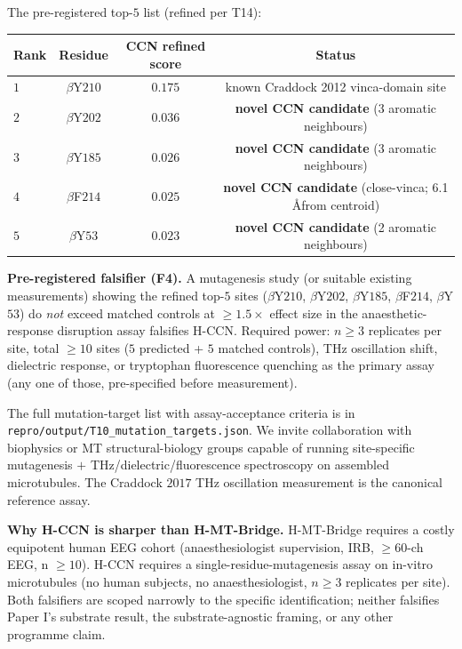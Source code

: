 \documentclass[11pt,a4paper]{article}
\begin{document}
The pre-registered top-$5$ list (refined per \textsf{T14}):

\begin{center}
\begin{tabular}{lccc}\toprule
Rank & Residue & CCN refined score & Status \\\midrule
$1$ & $\beta$Y$210$ & $0.175$ & known Craddock 2012 vinca-domain site \\
$2$ & $\beta$Y$202$ & $0.036$ & \textbf{novel CCN candidate} (3 aromatic neighbours) \\
$3$ & $\beta$Y$185$ & $0.026$ & \textbf{novel CCN candidate} (3 aromatic neighbours) \\
$4$ & $\beta$F$214$ & $0.025$ & \textbf{novel CCN candidate} (close-vinca; 6.1 \AA from centroid) \\
$5$ & $\beta$Y$53$ & $0.023$ & \textbf{novel CCN candidate} (2 aromatic neighbours) \\
\bottomrule\end{tabular}
\end{center}

\textbf{Pre-registered falsifier (F4).} A mutagenesis study (or
suitable existing measurements) showing the refined top-$5$ sites
($\beta$Y$210$, $\beta$Y$202$, $\beta$Y$185$, $\beta$F$214$,
$\beta$Y$53$) do \emph{not} exceed matched controls at
$\geq 1.5\times$ effect size in the anaesthetic-response disruption
assay falsifies H-CCN. Required power: $n \geq 3$ replicates per
site, total $\geq 10$ sites ($5$ predicted + $5$ matched controls),
THz oscillation shift, dielectric response, or tryptophan
fluorescence quenching as the primary assay (any one of those,
pre-specified before measurement).

The full mutation-target list with assay-acceptance criteria is in
\texttt{repro/output/T10\_mutation\_targets.json}. We invite
collaboration with biophysics or MT structural-biology groups capable
of running site-specific mutagenesis $+$ THz/dielectric/fluorescence
spectroscopy on assembled microtubules. The Craddock $2017$ THz
oscillation measurement is the canonical reference assay.

\textbf{Why H-CCN is sharper than H-MT-Bridge.} H-MT-Bridge requires
a costly equipotent human EEG cohort (anaesthesiologist supervision,
IRB, $\geq 60$-ch EEG, n $\geq 10$). H-CCN requires a
single-residue-mutagenesis assay on in-vitro microtubules
(no human subjects, no anaesthesiologist, $n \geq 3$ replicates per
site). Both falsifiers are scoped narrowly to the specific
identification; neither falsifies Paper I's substrate result, the
substrate-agnostic framing, or any other programme claim.
\end{document}
